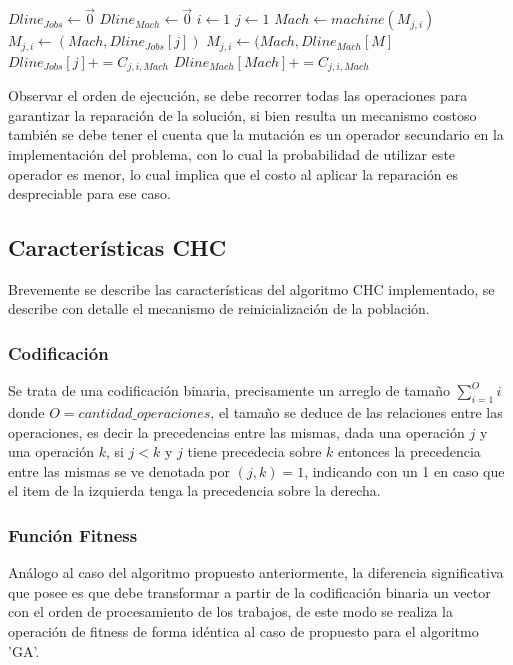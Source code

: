 \documentclass[journal]{IEEEtran}
\begin{document}
\begin{algorithmic}
\State $Dline_{Jobs} \gets \vec{0}$
\State $Dline_{Mach} \gets \vec{0}$
\State $i \gets 1$
    \State $j \gets 1$
      \State $Mach \gets machine(M_{j,i})$
        \State $M_{j,i} \gets (Mach, Dline_{Jobs}[j])$
      \Else
        \State $M_{j,i} \gets (Mach,Dline_{Mach}[M]$
      \EndIf     
      \State $Dline_{Jobs}[j]+=C_{j,i,Mach}$ 
      \State $Dline_{Mach}[Mach]+=C_{j,i,Mach}$    
    \EndFor
    \EndFor 
\end{algorithmic}

Observar el orden de ejecución, se debe recorrer todas las operaciones para garantizar la reparación de la solución, si bien resulta un mecanismo costoso también se debe tener el cuenta que la mutación es un operador secundario en la implementación del problema, con lo cual la probabilidad de utilizar este operador es menor, lo cual implica que el costo al aplicar la reparación es despreciable para ese caso.

\subsection{Características CHC}
Brevemente se describe las características del algoritmo CHC implementado, se describe con detalle el mecanismo de reinicialización de la población.
\subsubsection{Codificación}
Se trata de una codificación binaria, precisamente un arreglo de tamaño $\sum_{i=1}^{O}i$ donde $O = cantidad\_operaciones$, el tamaño se deduce de las relaciones entre las operaciones, es decir la precedencias entre las mismas, dada una operación $j$ y una operación $k$, si $j<k$ y $j$ tiene precedecia sobre $k$ entonces la precedencia entre las mismas se ve denotada por $(j,k)=1$, indicando con un 1 en caso que el item de la izquierda tenga la precedencia sobre la derecha.

\subsubsection{Función Fitness}
Análogo al caso del algoritmo propuesto anteriormente, la diferencia significativa que posee es que debe transformar a partir de la codificación binaria un vector con el orden de procesamiento de los trabajos, de este modo se realiza la operación de fitness de forma idéntica al caso de propuesto para el algoritmo 'GA'.
\end{document}
